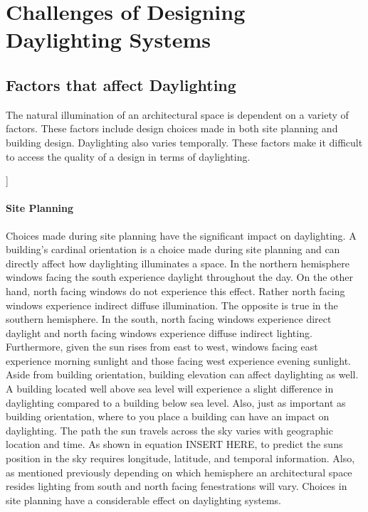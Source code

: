 \section{Challenges of Designing Daylighting Systems}

	\subsection{Factors that affect Daylighting}
		The natural illumination of an architectural space is dependent on a variety of factors. These factors include design choices made in both site planning and building design. Daylighting also varies temporally.
		These factors make it difficult to access the quality of a design in terms of daylighting.

		]\paragraph{Site Planning} Choices made during site planning have the significant impact on daylighting.
		A building's cardinal orientation is a choice made during site planning and can directly affect how daylighting illuminates a space.
		In the northern hemisphere windows facing the south experience daylight throughout the day.
		On the other hand, north facing windows do not experience this effect.
		Rather north facing windows experience indirect diffuse illumination.
		The opposite is true in the southern hemisphere.
		In the south, north facing windows experience direct daylight and north facing windows experience diffuse indirect lighting.
		Furthermore, given the sun rises from east to west, windows facing east experience morning sunlight and those facing west experience evening sunlight.
		Aside from building orientation, building elevation can affect daylighting as well.
		A building located well above sea level will experience a slight difference in daylighting compared to a building below sea level.
		Also, just as important as building orientation, where to you place a building can have an impact on daylighting.
		The path the sun travels across the sky varies with geographic location and time.
		As shown in equation INSERT HERE, to predict the suns position in the sky requires longitude, latitude, and temporal information. Also, as mentioned previously depending on which hemisphere an architectural space resides lighting from south and north facing fenestrations will vary.
		Choices in site planning have a considerable effect on daylighting systems. \\

